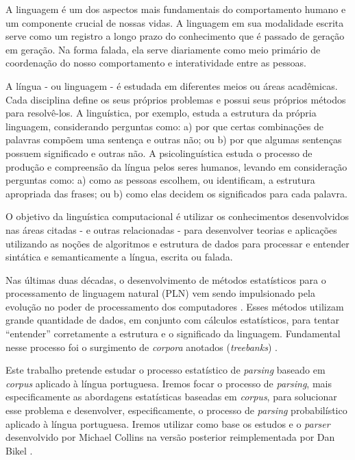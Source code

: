 A linguagem é um dos aspectos mais fundamentais do comportamento humano e um componente crucial de nossas vidas. A linguagem em sua modalidade escrita serve como um registro a longo prazo do conhecimento que é passado de geração em geração. Na forma falada, ela serve diariamente como meio primário de coordenação do nosso comportamento e interatividade entre as pessoas.

A língua - ou linguagem - é estudada em diferentes meios ou áreas acadêmicas. Cada disciplina define os seus próprios problemas e possui seus próprios métodos para resolvê-los. A linguística, por exemplo, estuda a estrutura da própria linguagem, considerando perguntas como: a) por que certas combinações de palavras compõem uma sentença e outras não; ou b) por que algumas sentenças possuem significado e outras não. A psicolinguística estuda o processo de produção e compreensão da língua pelos seres humanos, levando em consideração perguntas como: a) como as pessoas escolhem, ou identificam, a estrutura apropriada das frases; ou b) como elas decidem os significados para cada palavra.

O objetivo da linguística computacional é utilizar os conhecimentos desenvolvidos nas áreas citadas - e outras relacionadas - para desenvolver teorias e aplicações utilizando as noções de algoritmos e estrutura de dados para processar e entender sintática e semanticamente a língua, escrita ou falada.

Nas últimas duas décadas, o desenvolvimento de métodos estatísticos para o processamento de linguagem natural (PLN) vem sendo impulsionado pela evolução no poder de processamento dos computadores \cite{manning99, jurafsky}. Esses métodos utilizam grande quantidade de dados, em conjunto com cálculos estatísticos, para tentar ``entender'' corretamente a estrutura e o significado da linguagem. Fundamental nesse processo foi o surgimento de \emph{corpora} anotados (\emph{treebanks}) \cite{marcus93,marcus94,abeille03,sardinha04}.

Este trabalho pretende estudar o processo estatístico de \emph{parsing} baseado em \emph{corpus} aplicado à língua portuguesa. Iremos focar o processo de \emph{parsing}, mais especificamente as abordagens estatísticas baseadas em \emph{corpus}, para solucionar esse problema e desenvolver, especificamente, o processo de \emph{parsing} probabilístico aplicado à língua portuguesa. Iremos utilizar como base os estudos e o \emph{parser} desenvolvido por Michael Collins \cite{collins99,collins97} na versão posterior reimplementada por Dan Bikel \cite{bikel04}.


